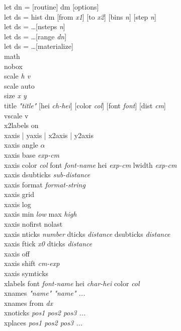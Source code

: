 {\sf let dn = [routine] dm [options]} \\
{\sf let ds = hist dm [from {\it x1}] [to {\it x2}] [bins {\it n}] [step {\it n}]} \\
{\sf let ds = \ldots [nsteps {\it n}]} \\
{\sf let ds = \ldots [range {\it dn}]} \\
{\sf let ds = \ldots [materialize]} \\
{\sf math } \\
{\sf nobox } \\
{\sf scale {\it h v}} \\
{\sf scale auto} \\
{\sf size {\it x y }}\\
{\sf title {\it "title"}  [hei {\it ch-hei}] [color {\it col}] [font {\it font}] [dist {\it cm}]  }   \\
{\sf vscale v} \\
{\sf x2labels on} \\
{\sf xaxis | yaxis | x2axis | y2axis}\\
{\sf xaxis angle $\alpha$} \\
{\sf xaxis base {\it exp-cm}}  \\
{\sf xaxis color {\it col} font {\it font-name}  hei {\it exp-cm} lwidth {\it exp-cm}} \\
{\sf xaxis dsubticks {\it sub-distance} }  \\
{\sf xaxis format {\it format-string} } \\
{\sf xaxis grid }  \\
{\sf xaxis log}  \\
{\sf xaxis min {\it low} max {\it high}}  \\
{\sf xaxis nofirst nolast}  \\
{\sf xaxis nticks {\it number} dticks {\it distance} dsubticks {\it distance}} \\
{\sf xaxis ftick {\it x0} dticks {\it distance}} \\
{\sf xaxis {\sf off}}  \\
{\sf xaxis shift {\it cm-exp}}  \\
{\sf xaxis symticks} \\
{\sf xlabels font {\it font-name} hei {\it char-hei} color {\it col} }\\
{\sf xnames {\it "name"  "name" ...}}  \\
{\sf xnames from {\it dx}}  \\
{\sf xnoticks {\it pos1 pos2 pos3 ...}}  \\
{\sf xplaces {\it pos1 pos2 pos3 ...}}  \\
